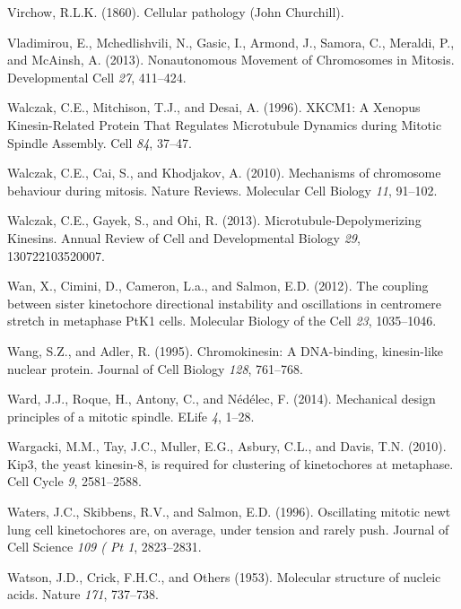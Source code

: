 \documentclass[12pt,a4paper,twoside,openright]{book}
\begin{document}
\hypertarget{ref-virchow1860cellular}{}
Virchow, R.L.K. (1860). Cellular pathology (John Churchill).

\hypertarget{ref-Vladimirou2013}{}
Vladimirou, E., Mchedlishvili, N., Gasic, I., Armond, J., Samora, C.,
Meraldi, P., and McAinsh, A. (2013). Nonautonomous Movement of
Chromosomes in Mitosis. Developmental Cell \emph{27}, 411--424.

\hypertarget{ref-Walczak1996}{}
Walczak, C.E., Mitchison, T.J., and Desai, A. (1996). XKCM1: A Xenopus
Kinesin-Related Protein That Regulates Microtubule Dynamics during
Mitotic Spindle Assembly. Cell \emph{84}, 37--47.

\hypertarget{ref-Walczak2010}{}
Walczak, C.E., Cai, S., and Khodjakov, A. (2010). Mechanisms of
chromosome behaviour during mitosis. Nature Reviews. Molecular Cell
Biology \emph{11}, 91--102.

\hypertarget{ref-Walczak2013a}{}
Walczak, C.E., Gayek, S., and Ohi, R. (2013). Microtubule-Depolymerizing
Kinesins. Annual Review of Cell and Developmental Biology \emph{29},
130722103520007.

\hypertarget{ref-Wan2012}{}
Wan, X., Cimini, D., Cameron, L.a., and Salmon, E.D. (2012). The
coupling between sister kinetochore directional instability and
oscillations in centromere stretch in metaphase PtK1 cells. Molecular
Biology of the Cell \emph{23}, 1035--1046.

\hypertarget{ref-Wang1995}{}
Wang, S.Z., and Adler, R. (1995). Chromokinesin: A DNA-binding,
kinesin-like nuclear protein. Journal of Cell Biology \emph{128},
761--768.

\hypertarget{ref-Ward2014}{}
Ward, J.J., Roque, H., Antony, C., and Nédélec, F. (2014). Mechanical
design principles of a mitotic spindle. ELife \emph{4}, 1--28.

\hypertarget{ref-Wargacki2010}{}
Wargacki, M.M., Tay, J.C., Muller, E.G., Asbury, C.L., and Davis, T.N.
(2010). Kip3, the yeast kinesin-8, is required for clustering of
kinetochores at metaphase. Cell Cycle \emph{9}, 2581--2588.

\hypertarget{ref-Waters1996a}{}
Waters, J.C., Skibbens, R.V., and Salmon, E.D. (1996). Oscillating
mitotic newt lung cell kinetochores are, on average, under tension and
rarely push. Journal of Cell Science \emph{109 ( Pt 1}, 2823--2831.

\hypertarget{ref-watson1953molecular}{}
Watson, J.D., Crick, F.H.C., and Others (1953). Molecular structure of
nucleic acids. Nature \emph{171}, 737--738.
\end{document}
